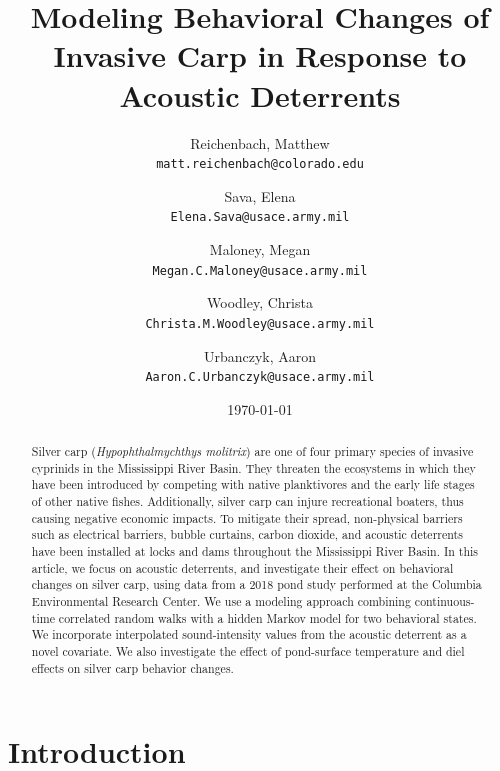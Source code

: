 \documentclass[12pt]{article}
\begin{document}
	
	
	\begin{abstract}
		Silver carp (\emph{Hypophthalmychthys molitrix}) are one of four primary species of invasive cyprinids in the Mississippi River Basin. They threaten the ecosystems in which they have been introduced by competing with native planktivores and the early life stages of other native fishes. Additionally, silver carp can injure recreational boaters, thus causing negative economic impacts. To mitigate their spread, non-physical barriers such as electrical barriers, bubble curtains, carbon dioxide, and acoustic deterrents have been installed at locks and dams throughout the Mississippi River Basin. In this article, we focus on acoustic deterrents, and investigate their effect on behavioral changes on silver carp, using data from a 2018 pond study performed at the Columbia Environmental Research Center. We use a modeling approach combining continuous-time correlated random walks with a hidden Markov model for two behavioral states. We incorporate interpolated sound-intensity values from the acoustic deterrent as a novel covariate. We also investigate the effect of pond-surface temperature and diel effects on silver carp behavior changes.
	\end{abstract}
	
	\title{Modeling Behavioral Changes of Invasive Carp in Response to Acoustic Deterrents}
	\author{
		Reichenbach, Matthew \\
		\texttt{matt.reichenbach@colorado.edu}
		\and
		Sava, Elena \\
		\texttt{Elena.Sava@usace.army.mil}
		\and
		Maloney, Megan \\
		\texttt{Megan.C.Maloney@usace.army.mil}
		\and
		Woodley, Christa \\
		\texttt{Christa.M.Woodley@usace.army.mil}
		\and
		Urbanczyk, Aaron \\
		\texttt{Aaron.C.Urbanczyk@usace.army.mil}
	}
	\date{\today}
	
	\maketitle
	
	\section{Introduction}
	
\end{document}
